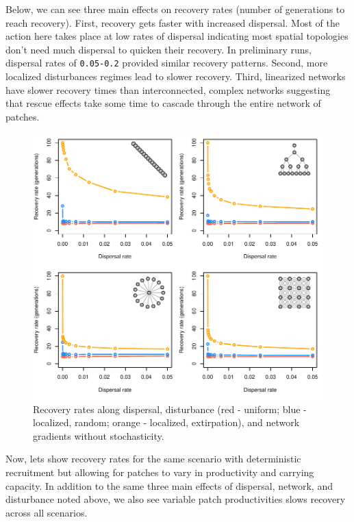 \documentclass[]{article}
\begin{document}
Below, we can see three main effects on recovery rates (number of
generations to reach recovery). First, recovery gets faster with
increased dispersal. Most of the action here takes place at low rates of
dispersal indicating most spatial topologies don't need much dispersal
to quicken their recovery. In preliminary runs, dispersal rates of
\texttt{0.05-0.2} provided similar recovery patterns. Second, more
localized disturbances regimes lead to slower recovery. Third,
linearized networks have slower recovery times than interconnected,
complex networks suggesting that rescue effects take some time to
cascade through the entire network of patches.

\begin{figure}[H]

{\centering \includegraphics{Managing_for_ecological_surprises_in_metapopulations_files/figure-latex/general results-1} 

}

\caption{Recovery rates along dispersal, disturbance (red - uniform; blue - localized, random; orange - localized, extirpation), and network gradients without stochasticity.}\label{fig:general results}
\end{figure}
\newpage

Now, lets show recovery rates for the same scenario with deterministic
recruitment but allowing for patches to vary in productivity and
carrying capacity. In addition to the same three main effects of
dispersal, network, and disturbance noted above, we also see variable
patch productivities slows recovery across all scenarios.
\end{document}
